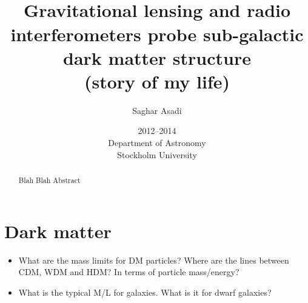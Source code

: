 \documentclass[paper=a4, fontsize=11pt]{scrartcl} %
\title{    
\normalfont \normalsize 
\horrule{0.5pt} \\[0.4cm] %
\huge  Gravitational lensing and radio interferometers probe sub-galactic dark matter structure\\
\large (story of my life) %
\horrule{2pt} \\[0.5cm] %
}
\author{Saghar Asadi} %
\date{\normalsize 2012--2014 \\ Department of Astronomy \\ Stockholm University} %
\numberwithin{equation}{section} %
\numberwithin{figure}{section} %
\numberwithin{table}{section} %
\begin{document}
\maketitle %
\newpage
\tableofcontents
\newpage

\begin{abstract}
Blah Blah Abstract
\end{abstract}

\newpage
\section{Dark matter}

\begin{itemize}
\item What are the mass limits for DM particles? Where are the lines between CDM, WDM and HDM? In terms of particle mass/energy?
\item What is the typical M/L for galaxies. What is it for dwarf galaxies?


\end{itemize}
\end{document}
